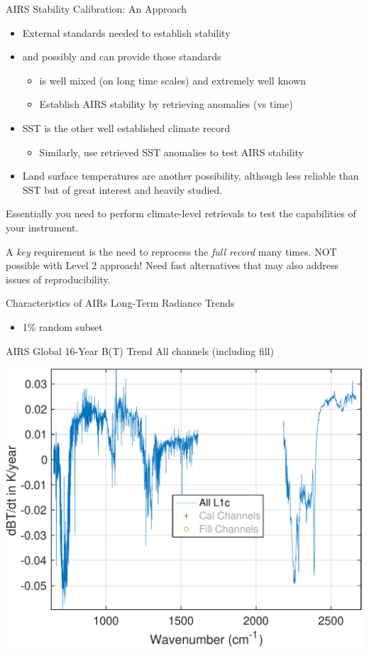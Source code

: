 \documentclass[10pt,t]{beamer}
\begin{document}
\begin{frame}[label={sec:org7449b1f}]{AIRS Stability Calibration: An Approach}
\begin{itemize}
\item External standards needed to establish stability
\item \cd and possibly \nitrous and \methane can provide those standards
\begin{itemize}
\item \cd is well mixed (on long time scales) and extremely well known
\item Establish AIRS stability by retrieving \cd anomalies (vs time)
\end{itemize}
\item SST is the other well established climate record
\begin{itemize}
\item Similarly, use retrieved SST anomalies to test AIRS stability
\end{itemize}
\item Land surface temperatures are another possibility, although less reliable than SST but of great interest and heavily studied.
\end{itemize}

Essentially you need to perform climate-level retrievals to test the capabilities of your instrument.  

A \emph{key} requirement is the need to reprocess the \emph{full record} many times.  NOT possible with Level 2 approach!  Need fast alternatives that may also address issues of reproducibility.
\end{frame}

\begin{frame}[label={sec:org370b754}]{Characteristics of AIRs Long-Term Radiance Trends}
\begin{itemize}
\item 1\% random subset
\end{itemize}
\end{frame}
\begin{frame}[label={sec:orgd89b22c}]{AIRS Global 16-Year B(T) Trend}
All channels (including fill)

\begin{center}
\includegraphics[width=0.85\linewidth]{./Figs/Pdf/rand_global_trend_l1c_overview.pdf}
\end{center}
\end{frame}
\end{document}
